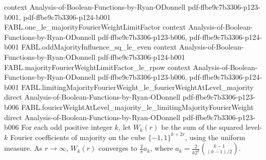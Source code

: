 \begin{theorem}
  {context}
  {Analysis-of-Boolean-Functions-by-Ryan-ODonnell}
  {pdf-ffbe9c7b3306-p123-b001,
    pdf-ffbe9c7b3306-p124-b001}
\proofstep
  {FABL.one_le_majorityFourierWeightLimitFactor}
  {context}
  {Analysis-of-Boolean-Functions-by-Ryan-ODonnell}
  {pdf-ffbe9c7b3306-p123-b006,
    pdf-ffbe9c7b3306-p124-b001}
\proofstep
  {FABL.oddMajorityInfluence_sq_le_even}
  {context}
  {Analysis-of-Boolean-Functions-by-Ryan-ODonnell}
  {pdf-ffbe9c7b3306-p124-b001}
\proofstep
  {FABL.majorityFourierWeightLimitFactor_le_rpow}
  {context}
  {Analysis-of-Boolean-Functions-by-Ryan-ODonnell}
  {pdf-ffbe9c7b3306-p123-b006,
    pdf-ffbe9c7b3306-p124-b001}
\proofstep
  {FABL.limitingMajorityFourierWeight_le_fourierWeightAtLevel_majority}
  {direct}
  {Analysis-of-Boolean-Functions-by-Ryan-ODonnell}
  {pdf-ffbe9c7b3306-p123-b006}
\proofstep
  {FABL.fourierWeightAtLevel_majority_le_limitingMajorityFourierWeight}
  {direct}
  {Analysis-of-Boolean-Functions-by-Ryan-ODonnell}
  {pdf-ffbe9c7b3306-p123-b006}
For each odd positive integer $k$, let $W_k(r)$ be the sum of the squared level-$k$
Fourier coefficients of majority on the cube $\{-1,1\}^{k+2r}$, using the uniform
measure. As $r\to\infty$, $W_k(r)$ converges to $\frac{2}{\pi}a_k$, where
$a_k=\frac{2}{k2^k}\binom{k-1}{(k-1)/2}$.
\end{theorem}

